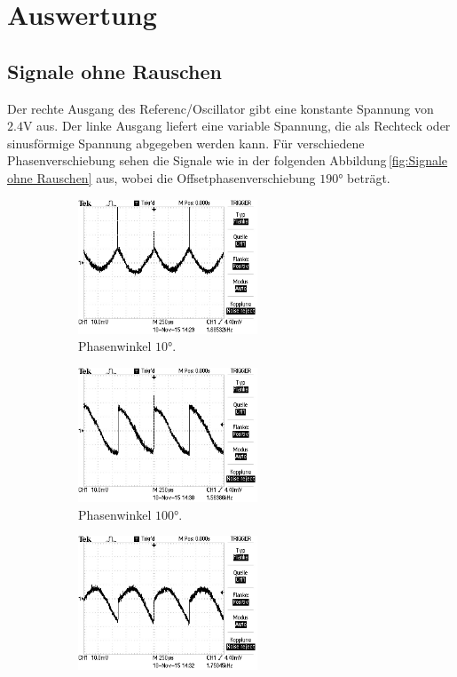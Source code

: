 \section{Auswertung}
\label{sec:Auswertung}
\subsection{Signale ohne Rauschen}
\label{sec:Signale ohne Rauschen}
Der rechte Ausgang des Referenc/Oscillator gibt eine konstante Spannung
von $2.4\si{\volt}$ aus. Der linke Ausgang liefert eine variable Spannung, die
als Rechteck oder sinusförmige Spannung abgegeben werden kann. Für verschiedene
Phasenverschiebung sehen die Signale wie in der folgenden
Abbildung\,\ref{fig:Signale ohne Rauschen} aus, wobei die Offsetphasenverschiebung
 $190°$ beträgt.
\begin{figure}
  \centering
  \begin{subfigure}{0.48\textwidth}
    \centering
    \includegraphics[height=4cm]{Bilder/or/or10.JPG}
    \caption{Phasenwinkel $10°$.}
    \label{fig:orp10}
  \end{subfigure}
  \begin{subfigure}{0.48\textwidth}
    \centering
    \includegraphics[height=4cm]{Bilder/or/or100.JPG}
    \caption{Phasenwinkel $100°$.}
    \label{fig:orp100}
  \end{subfigure}
  \begin{subfigure}{0.48\textwidth}
    \centering
    \includegraphics[height=4cm]{Bilder/or/or150.JPG}

\end{subfigure}
\end{figure}
